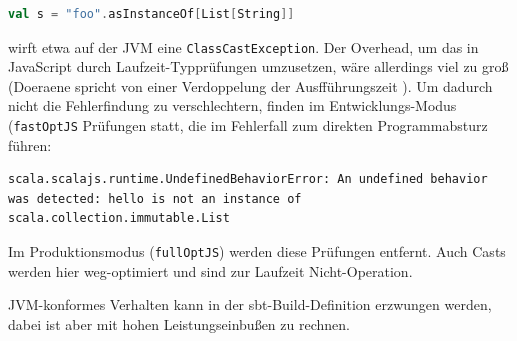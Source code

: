 \documentclass[a4paper, 12pt, hidelinks, listof=totoc, listoftables=totoc, bibliography=totoc]{scrreprt}
\newcommand{\code}[1]{\lstinline[language=Scala, style=inline]|#1|}
\newcommand{\scala}[1]{\lstinline[language=Scala, style=inline]|#1|}
\begin{document}
\begin{lstlisting}[language=Scala, style=snippet]
val s = "foo".asInstanceOf[List[String]]
\end{lstlisting}

wirft etwa auf der JVM eine \scala{ClassCastException}. Der Overhead, um das in JavaScript durch Laufzeit-Typprüfungen umzusetzen, wäre allerdings viel zu groß (Doeraene spricht von einer Verdoppelung der Ausfführungszeit \cite[Folie 23 ff., Min. 15]{doeraene2015.SSP}). Um dadurch nicht die Fehlerfindung zu verschlechtern, finden im Entwicklungs-Modus (\code{fastOptJS} Prüfungen statt, die im Fehlerfall zum direkten Programmabsturz führen:

\begin{lstlisting}
scala.scalajs.runtime.UndefinedBehaviorError: An undefined behavior was detected: hello is not an instance of scala.collection.immutable.List
\end{lstlisting}

Im Produktionsmodus (\code{fullOptJS}) werden diese Prüfungen entfernt. Auch Casts werden hier weg-optimiert und sind zur Laufzeit Nicht-Operation.

JVM-konformes Verhalten kann in der sbt-Build-Definition erzwungen werden, dabei ist aber mit hohen Leistungseinbußen zu rechnen.\cite[Folie 23 ff., Min. 15]{doeraene2015.SSP}\cite{scalajs.DSS}

	
\end{document}
